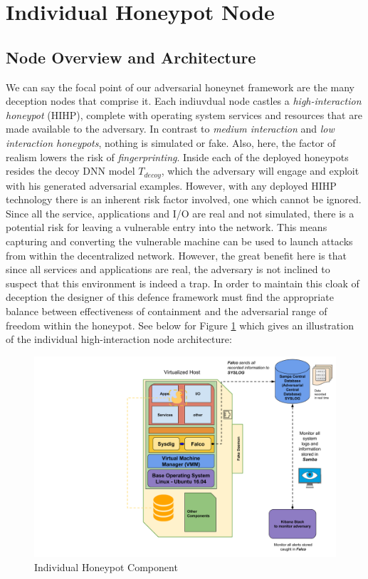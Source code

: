 \documentclass[grad,lot,lof,11pt,oneside,onehalfspace]{RUthesis}
\begin{document}
\section{Individual Honeypot Node}
\subsection{Node Overview and Architecture}
We can say the focal point of our adversarial honeynet framework are the many deception nodes that comprise it. Each indiuvdual node castles a \textit{high-interaction honeypot} (HIHP), complete with operating system services and resources that are made available to the adversary. In contrast to \textit{medium interaction} and \textit{low interaction honeypots}, nothing is simulated or fake. Also, here, the factor of realism lowers the risk of \textit{fingerprinting}. Inside each of the deployed honeypots resides the decoy DNN model \textit{$T_{decoy}$}, which the adversary will engage and exploit with his generated adversarial examples. However, with any deployed HIHP technology there is an inherent risk factor involved, one which cannot be ignored. Since all the service, applications and I/O are real and not simulated, there is a potential risk for leaving a vulnerable entry into the network. This means capturing and converting the vulnerable machine can be used to launch attacks from within the decentralized network. However, the great benefit here is that since all services and applications are real, the adversary is not inclined to suspect that this environment is indeed a trap. In order to maintain this cloak of deception the designer of this defence framework must find the appropriate balance between effectiveness of containment and the adversarial range of freedom within the honeypot. See below for Figure \ref{fig:HIHP} which gives an illustration of the individual     high-interaction node architecture:
\begin{figure}[h]
\centering
\includegraphics[width=0.9\linewidth]{"Images/Chapter 4/HIHP"}
\caption{Individual Honeypot Component}
\label{fig:HIHP}
\end{figure}
\end{document}
